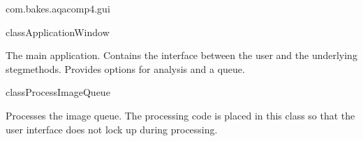 \begin{texdocpackage}{com.bakes.aqacomp4.gui}
\label{texdoclet:com.bakes.aqacomp4.gui}

\begin{texdocclass}{class}{ApplicationWindow}
\label{texdoclet:com.bakes.aqacomp4.gui.ApplicationWindow}
\begin{texdocclassintro}
The main application. Contains the interface between the user and the underlying stegmethods. Provides options for analysis and a queue.\end{texdocclassintro}
\begin{texdocclassconstructors}
\end{texdocclassconstructors}
\begin{texdocclassmethods}
\end{texdocclassmethods}
\end{texdocclass}


\begin{texdocclass}{class}{ProcessImageQueue}
\label{texdoclet:com.bakes.aqacomp4.gui.ProcessImageQueue}
\begin{texdocclassintro}
Processes the image queue. The processing code is placed in this class
 so that the user interface does not lock up during processing.\end{texdocclassintro}
\begin{texdocclassconstructors}
\end{texdocclassconstructors}
\begin{texdocclassmethods}
\end{texdocclassmethods}
\end{texdocclass}



\end{texdocpackage}
